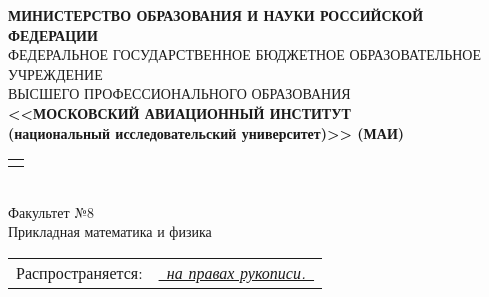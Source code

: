 
\begin{titlepage}

\newcommand{\byhand}[1]{\underline{\it \color{blue} \ #1\ }}

{\small\begin{center}
        {\bfseries
            МИНИСТЕРСТВО ОБРАЗОВАНИЯ И НАУКИ РОССИЙСКОЙ ФЕДЕРАЦИИ
        } \\
        { \footnotesize
            ФЕДЕРАЛЬНОЕ ГОСУДАРСТВЕННОЕ БЮДЖЕТНОЕ ОБРАЗОВАТЕЛЬНОЕ УЧРЕЖДЕНИЕ \\
                    ВЫСШЕГО ПРОФЕССИОНАЛЬНОГО ОБРАЗОВАНИЯ \\
        }
        {\bfseries
            <<МОСКОВСКИЙ АВИАЦИОННЫЙ ИНСТИТУТ \\
            (национальный исследовательский университет)>> (МАИ)\\
        }
        \begin{tabular}{p{13cm}}
            \hline \\
        \end{tabular}\\
        {Факультет №8\\
            { \footnotesize  Прикладная математика и физика }
        }
\end{center}}

\vspace{24pt}

{ \small \begin{flushright}
        \begin{tabular}{rl}
            Распространяется: & \byhand{на правах рукописи.} \\
        \end{tabular}
\end{flushright}}

\vspace{24pt}


\vspace{24pt}




\end{titlepage}

